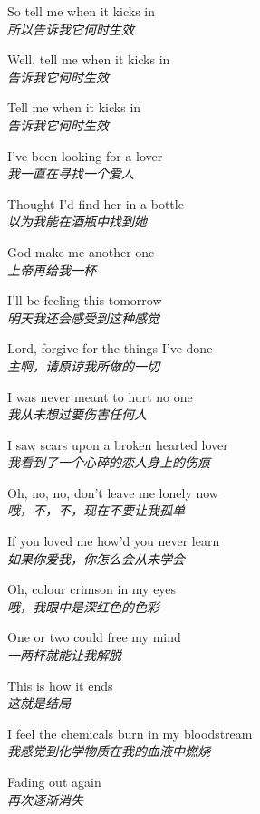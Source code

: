 \begin{spacing}{1.5}
\begin{flushleft}
So tell me when it kicks in\\
\textit{所以告诉我它何时生效}\lyricspace

Well, tell me when it kicks in\\
\textit{告诉我它何时生效}\lyricspace

Tell me when it kicks in\\
\textit{告诉我它何时生效}\lyricspace

I've been looking for a lover\\
\textit{我一直在寻找一个爱人}\lyricspace

Thought I'd find her in a bottle\\
\textit{以为我能在酒瓶中找到她}\lyricspace

God make me another one\\
\textit{上帝再给我一杯}\lyricspace

I'll be feeling this tomorrow\\
\textit{明天我还会感受到这种感觉}\lyricspace

Lord, forgive for the things I've done\\
\textit{主啊，请原谅我所做的一切}\lyricspace

I was never meant to hurt no one\\
\textit{我从未想过要伤害任何人}\lyricspace

I saw scars upon a broken hearted lover\\
\textit{我看到了一个心碎的恋人身上的伤痕}\lyricspace

Oh, no, no, don't leave me lonely now\\
\textit{哦，不，不，现在不要让我孤单}\lyricspace

If you loved me how'd you never learn\\
\textit{如果你爱我，你怎么会从未学会}\lyricspace

Oh, colour crimson in my eyes\\
\textit{哦，我眼中是深红色的色彩}\lyricspace

One or two could free my mind\\
\textit{一两杯就能让我解脱}\lyricspace

This is how it ends\\
\textit{这就是结局}\lyricspace

I feel the chemicals burn in my bloodstream\\
\textit{我感觉到化学物质在我的血液中燃烧}\lyricspace

Fading out again\\
\textit{再次逐渐消失}\lyricspace


\end{flushleft}
\end{spacing}
